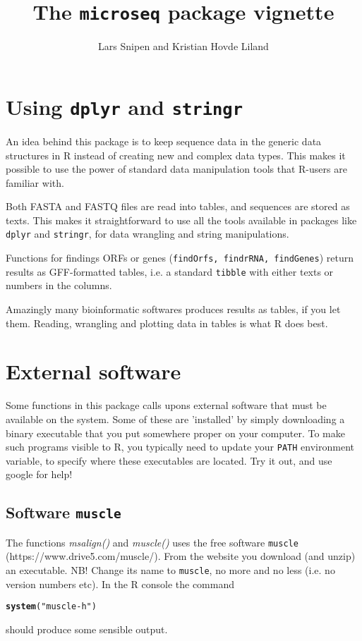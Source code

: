 \documentclass{article}\usepackage[]{graphicx}\usepackage[]{color}
\title{The \texttt{microseq} package vignette}
\author{Lars Snipen and Kristian Hovde Liland}
\date{}
\makeatletter
\newcommand{\hlstr}[1]{\textcolor[rgb]{0.192,0.494,0.8}{#1}}%
\newcommand{\hlstd}[1]{\textcolor[rgb]{0.345,0.345,0.345}{#1}}%
\newcommand{\hlkwd}[1]{\textcolor[rgb]{0.737,0.353,0.396}{\textbf{#1}}}%
\newenvironment{kframe}{%
 \def\at@end@of@kframe{}%
 \ifinner\ifhmode%
  \def\at@end@of@kframe{\end{minipage}}%
  \begin{minipage}{\columnwidth}%
 \fi\fi%
 \def\FrameCommand##1{\hskip\@totalleftmargin \hskip-\fboxsep
 \colorbox{shadecolor}{##1}\hskip-\fboxsep
     \hskip-\linewidth \hskip-\@totalleftmargin \hskip\columnwidth}%
 \MakeFramed {\advance\hsize-\width
   \@totalleftmargin\z@ \linewidth\hsize
   \@setminipage}}%
 {\par\unskip\endMakeFramed%
 \at@end@of@kframe}
\newenvironment{knitrout}{}{} %
\makeatother
\begin{document}

\maketitle


\section{Using \texttt{dplyr} and \texttt{stringr}}
An idea behind this package is to keep sequence data in the generic data structures in R instead of creating new and complex data types. This makes it possible to use the power of standard data manipulation tools that R-users are familiar with.

Both FASTA and FASTQ files are read into tables, and sequences are stored as texts. This makes it straightforward to use all the tools available in packages like \texttt{dplyr} and \texttt{stringr}, for data wrangling and string manipulations.

Functions for findings ORFs or genes (\texttt{findOrfs, findrRNA, findGenes}) return results as GFF-formatted tables, i.e. a standard \texttt{tibble} with either texts or numbers in the columns.

Amazingly many bioinformatic softwares produces results as tables, if you let them. Reading, wrangling and plotting data in tables is what R does best.




\section{External software}
Some functions in this package calls upons external software that must be available on the system. Some of these are 'installed' by simply downloading a binary executable that you put somewhere proper on your computer. To make such programs visible to R, you typically need to update your \texttt{PATH} environment variable, to specify where these executables are located. Try it out, and use google for help!


\subsection{Software \texttt{muscle}}
The functions \emph{msalign()} and \emph{muscle()} uses the free software \texttt{muscle} (https://www.drive5.com/muscle/). From the website you download (and unzip) an executable. NB! Change its name to \texttt{muscle}, no more and no less (i.e. no version numbers etc). In the R console the command
\begin{knitrout}
\color{fgcolor}\begin{kframe}
\begin{alltt}
\hlkwd{system}\hlstd{(}\hlstr{"muscle -h"}\hlstd{)}
\end{alltt}
\end{kframe}
\end{knitrout}
should produce some sensible output.
\end{document}
